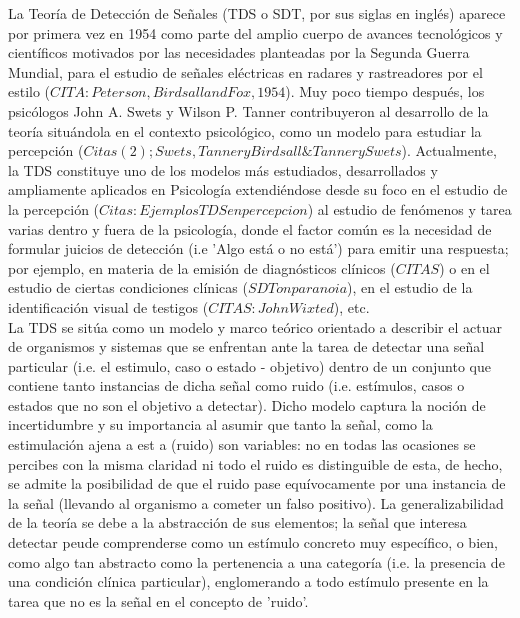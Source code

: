 La Teoría de Detección de Señales (TDS o SDT, por sus siglas en inglés) aparece por primera vez en 1954 como parte del amplio cuerpo de avances tecnológicos y científicos motivados por las necesidades planteadas por la Segunda Guerra Mundial, para el estudio de señales eléctricas en radares y rastreadores por el estilo ($CITA: Peterson, Birdsall and Fox, 1954$). Muy poco tiempo después, los psicólogos John A. Swets y Wilson P. Tanner contribuyeron al desarrollo de la teoría situándola en el contexto psicológico, como un modelo para estudiar la percepción ($Citas (2); Swets, Tanner y Birdsall  \& Tanner y Swets$). Actualmente, la TDS constituye uno de los modelos más estudiados, desarrollados y ampliamente aplicados en Psicología extendiéndose desde su foco en el estudio de la percepción ($Citas: Ejemplos TDS en percepcion$) al estudio de fenómenos y tarea varias dentro y fuera de la psicología, donde el factor común es la necesidad de formular juicios de detección (i.e 'Algo está o no está') para emitir una respuesta; por ejemplo, en materia de la emisión de diagnósticos clínicos ($CITAS$) o en el estudio de ciertas condiciones clínicas ($SDT on paranoia$), en el estudio de la identificación visual de testigos ($CITAS: John Wixted$), etc.\\ 

La TDS se sitúa como un modelo y marco teórico orientado a describir el actuar de organismos y sistemas que se enfrentan ante la tarea de detectar una señal particular (i.e. el estimulo, caso o estado - objetivo) dentro de un conjunto que contiene tanto instancias de dicha señal como ruido (i.e. estímulos, casos o estados que no son el objetivo a detectar). Dicho modelo captura la noción de incertidumbre y su importancia al asumir que tanto la señal, como la estimulación ajena a est a (ruido) son variables: no en todas las ocasiones se percibes con la misma claridad ni todo el ruido es distinguible de esta, de hecho, se admite la posibilidad de que el ruido pase equívocamente por una instancia de la señal (llevando al organismo a cometer un falso positivo). La generalizabilidad de la teoría se debe a la abstracción de sus elementos; la señal que interesa detectar peude comprenderse como un estímulo concreto muy específico, o bien, como algo tan abstracto como la pertenencia a una categoría (i.e. la presencia de una condición clínica particular), englomerando a todo estímulo presente en la tarea que no es la señal en el concepto de 'ruido'.  \\ 

